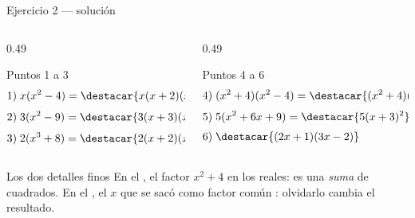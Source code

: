 \documentclass[aspectratio=169,10pt]{beamer}
\begin{document}
\begin{frame}{Ejercicio 2 — solución}
  \tiny
  \begin{columns}[T,onlytextwidth]
    \begin{column}{0.49\textwidth}
      \begin{block}{Puntos 1 a 3}
        \tiny
        \begin{align*}
          1)\;& x(x^{2}-4) = \destacar{x(x+2)(x-2)} \\[0.3em]
          2)\;& 3(x^{2}-9) = \destacar{3(x+3)(x-3)} \\[0.3em]
          3)\;& 2(x^{3}+8) = \destacar{2(x+2)(x^{2}-2x+4)}
        \end{align*}
      \end{block}
    \end{column}
    \begin{column}{0.49\textwidth}
      \begin{block}{Puntos 4 a 6}
        \tiny
        \begin{align*}
          4)\;& (x^{2}+4)(x^{2}-4)
                = \destacar{(x^{2}+4)(x+2)(x-2)} \\[0.3em]
          5)\;& 5(x^{2}+6x+9) = \destacar{5(x+3)^{2}} \\[0.3em]
          6)\;& \destacar{(2x+1)(3x-2)}
        \end{align*}
      \end{block}
    \end{column}
  \end{columns}

  \vspace{0.08cm}
  \begin{alertblock}{Los dos detalles finos}
    \tiny
    En el , el factor $x^{2}+4$  en los
    reales: es una \emph{suma} de cuadrados. \quad
    En el , el $x$ que se sacó como factor común : olvidarlo cambia el resultado.
  \end{alertblock}
\end{frame}
\end{document}

